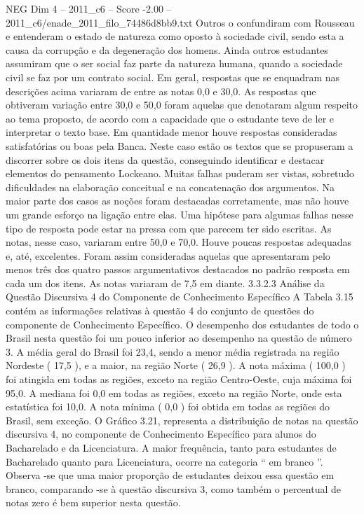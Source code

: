 \begin{textsample}{NEG Dim 4 – 2011\_c6 – Score -2.00 – 2011\_c6/enade\_2011\_filo\_74486d8bb9.txt}
Outros o confundiram com Rousseau e entenderam o estado de natureza como oposto à sociedade civil, sendo esta a causa da corrupção e da degeneração dos homens.
Ainda outros estudantes assumiram que o ser social faz parte da natureza humana, quando a sociedade civil se faz por um contrato social.
Em geral, respostas que se enquadram nas descrições acima variaram de entre as notas 0,0 e 30,0.
As respostas que obtiveram variação entre 30,0 e 50,0 foram aquelas que denotaram algum respeito ao tema proposto, de acordo com a capacidade que o estudante teve de ler e interpretar o texto base.
Em quantidade menor houve respostas consideradas satisfatórias ou boas pela Banca.
Neste caso estão os textos que se propuseram a discorrer sobre os dois itens da questão, conseguindo identificar e destacar elementos do pensamento Lockeano.
Muitas falhas puderam ser vistas, sobretudo dificuldades na elaboração conceitual e na concatenação dos argumentos.
Na maior parte dos casos as noções foram destacadas corretamente, mas não houve um grande esforço na ligação entre elas.
Uma hipótese para algumas falhas nesse tipo de resposta pode estar na pressa com que parecem ter sido escritas.
As notas, nesse caso, variaram entre 50,0 e 70,0.
Houve poucas respostas adequadas e, até, excelentes.
Foram assim consideradas aquelas que apresentaram pelo menos três dos quatro passos argumentativos destacados no padrão resposta em cada um dos itens.
As notas variaram de 7,5 em diante. 3.3.2.3 Análise da Questão Discursiva 4 do Componente de Conhecimento Específico A Tabela 3.15 contém as informações relativas à questão 4 do conjunto de questões do componente de Conhecimento Específico.
O desempenho dos estudantes de todo o Brasil nesta questão foi um pouco inferior ao desempenho na questão de número 3.
A média geral do Brasil foi 23,4, sendo a menor média registrada na região Nordeste ( 17,5 ), e a maior, na região Norte ( 26,9 ).
A nota máxima ( 100,0 ) foi atingida em todas as regiões, exceto na região Centro-Oeste, cuja máxima foi 95,0.
A mediana foi 0,0 em todas as regiões, exceto na região Norte, onde esta estatística foi 10,0.
A nota mínima ( 0,0 ) foi obtida em todas as regiões do Brasil, sem exceção.
O Gráfico 3.21, representa a distribuição de notas na questão discursiva 4, no componente de Conhecimento Específico para alunos do Bacharelado e da Licenciatura.
A maior frequência, tanto para estudantes de Bacharelado quanto para Licenciatura, ocorre na categoria “ em branco ”.
Observa -se que uma maior proporção de estudantes deixou essa questão em branco, comparando -se à questão discursiva 3, como também o percentual de notas zero é bem superior nesta questão.

\end{textsample}
